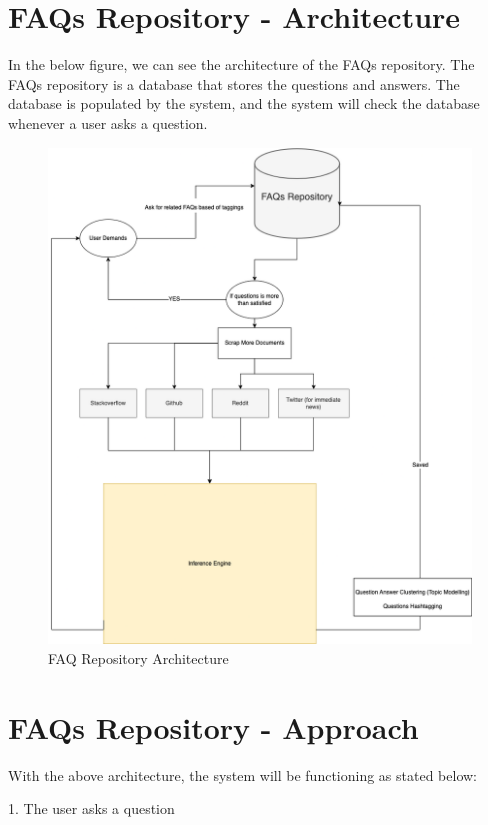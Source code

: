\section{FAQs Repository - Architecture} 
In the below figure, we can see the architecture of the FAQs repository. The FAQs repository is a database that stores the questions and answers. The database is populated by the system, and the system will check the database whenever a user asks a question.

\pagebreak
\begin{figure}[H]
  \centering
  \noindent \includegraphics[scale=0.50]{assets/faq_repo_workflow.png}
\caption{FAQ Repository Architecture}\label{faq_repo_architecture}
\end{figure}

\section{FAQs Repository - Approach}
With the above architecture, the system will be functioning as stated below:

1. The user asks a question

